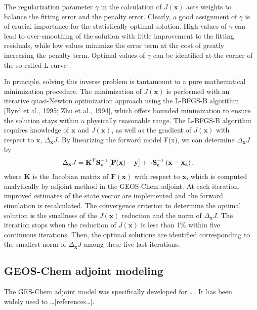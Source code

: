  The regularization parameter $\gamma$ in the calculation of $J(\mathbf{x})$ acts weights
 to balance the fitting error and the penalty error. Clearly, a good assignment of 
 $\gamma$ is of crucial importance for the statistically optimal solution. High values 
 of $\gamma$ can lead to over-smoothing of the solution with little improvement to the
 fitting residuals, while low values minimize the error term at the cost of greatly 
 increasing the penalty term. Optimal values of $\gamma$ can be identified at the 
 corner of the so-called L-curve \citep{hansen98}.

 In principle, solving this inverse problem is tantamount to a pure 
 mathematical minimization procedure. The minimization of $J(\mathbf{x})$ 
 is performed with an iterative quasi-Newton optimization approach 
 using the L-BFGS-B algorithm [Byrd et al., 1995; Zhu et al., 1994], 
 which offers bounded minimization to ensure the solution stays 
 within a physically reasonable range. The L-BFGS-B algorithm 
 requires knowledge of $\mathbf{x}$ and $J(\mathbf{x})$, 
 as well as the gradient of $J(\mathbf{x})$ with respect to 
 $\mathbf{x}$, $\Delta_\mathbf{x}J$. By linearizing the forward model F(x), 
 we can determine $\Delta_\mathbf{x}J$ by
 \begin{equation} \label{eq:dcost}
  \Delta_\mathbf{x}J = \mathbf{K}^T \mathbf{S}_\text{y}^{-1} \left[ \mathbf{F(x)-y}\right]
                     + \gamma \mathbf{S}_\text{a}^{-1} \left( \mathbf{x}-\mathbf{x}_\text{a} \right) \mbox{,} 
 \end{equation}
 where $\mathbf{K}$ is the Jacobian matrix of $\mathbf{F(x)}$ 
 with respect to $\mathbf{x}$, which is computed analytically by adjoint method 
 in the GEOS-Chem adjoint. At each iteration, improved estimates 
 of the state vector are implemented and the forward simulation is recalculated. 
 The convergence criterion to determine the optimal solution is the smallness 
 of the $J(\mathbf{x})$ reduction and the norm of $\Delta_\mathbf{x}J$. 
 The iteration stops when the reduction of $J(\mathbf{x})$ is less than 1\% within 
 five continuous iterations. Then, the optimal solutions are identified 
 corresponding to the smallest norm of $\Delta_\mathbf{x}J$ among 
 these five last iterations. 

 \subsection{GEOS-Chem adjoint modeling}

 The GES-Chem adjoint model was specifically developed for \ldots \citep{henze07,henze09}.
 It has been widely used to \ldots [references\ldots]. 

